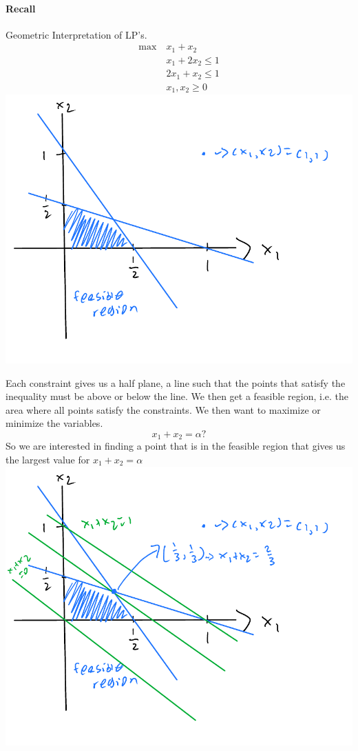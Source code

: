 \documentclass[12 pt]{article}
\begin{document}
        \paragraph{Recall} Geometric Interpretation of LP's.
        \begin{align*}
          \max\ & x_1 + x_2
          \\ & x_1 + 2x_2 \leq 1
          \\ & 2x_1 + x_2 \leq 1
          \\ & x_1, x_2 \geq 0
        \end{align*}
        \includegraphics[width=.9\textwidth]{i105.pdf}

        Each constraint gives us a half plane, a line such that the
        points that satisfy the inequality must be above or below the
        line. We then get a feasible region, i.e. the area where all
        points satisfy the constraints. We then want to maximize or
        minimize the variables.
        $$x_1 + x_2 = \alpha ?$$
        So we are interested in finding a point that is in the
        feasible region that gives us the largest value for $x_1 + x_2
        = \alpha$
        \\\includegraphics[width=.9\textwidth]{i106.pdf}
\end{document}
